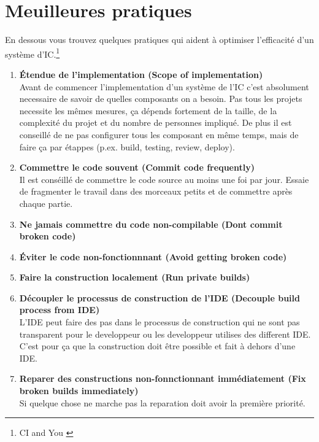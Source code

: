 \section{Meuilleures pratiques}
\label{sec:meuilleurespratiques}

En dessous vous trouvez quelques pratiques qui aident à optimiser l'efficacité d'un système d'IC.\footnote{CI and You \cite[p~47]{duvallconint}}

\begin{enumerate}

\item \textbf{Étendue de l'implementation (Scope of implementation)}\\
Avant de commencer l'implementation d'un système de l'IC c'est absolument necessaire de savoir de quelles composants on a besoin. Pas tous les projets necessite les mêmes mesures, ça dépends fortement de la taille, de la complexité du projet et du nombre de personnes impliqué. 
De plus il est conseillé de ne pas configurer tous les composant en même temps, mais de faire ça par étappes (p.ex. build, testing, review, deploy). 

\item\textbf{Commettre le code souvent (Commit code frequently)}\\
Il est conséillé de commettre le code source au moins une foi par jour. Essaie de fragmenter le travail dans des morceaux petits et de commettre après chaque partie.

\item\textbf{Ne jamais commettre du code non-compilable (Dont commit broken code)}

\item\textbf{Éviter le code non-fonctionnnant (Avoid getting broken code)}

\item\textbf{Faire la construction localement (Run private builds)}

\item\textbf{Découpler le processus de construction de l'IDE (Decouple build process from IDE)}\\
L'IDE peut faire des pas dans le processus de construction qui ne sont pas transparent pour le developpeur ou les developpeur utilises des different IDE. C'est pour ça que la construction doit être possible et fait à dehors d'une IDE.

\item\textbf{Reparer des constructions non-fonnctionnant immédiatement (Fix broken builds immediately)}\\
Si quelque chose ne marche pas la reparation doit avoir la première priorité.


\end{enumerate}
